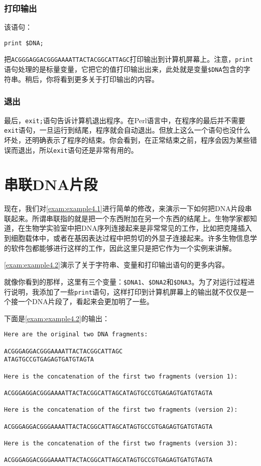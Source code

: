 \subsubsection{打印输出}
该语句：

\begin{lstlisting}
print $DNA;
\end{lstlisting}
把\verb|ACGGGAGGACGGGAAAATTACTACGGCATTAGC|打印输出到计算机屏幕上。注意，\verb|print|语句处理的是标量变量，它把它的值打印输出出来，此处就是变量\verb|$DNA|包含的字符串。稍后，你将看到更多关于打印输出的内容。

\subsubsection{退出}
最后，\verb|exit;|语句告诉计算机退出程序。在Perl语言中，在程序的最后并不需要\verb|exit|语句，一旦运行到结尾，程序就会自动退出。但放上这么一个语句也没什么坏处，还明确表示了程序的结束。你会看到，在正常结束之前，程序会因为某些错误而退出，所以\verb|exit|语句还是非常有用的。

\section{串联DNA片段}
现在，我们对\autoref{exam:example4.1}进行简单的修改，来演示一下如何把DNA片段串联起来。所谓串联指的就是把一个东西附加在另一个东西的结尾上。生物学家都知道，在生物学实验室中把DNA序列连接起来是非常常见的工作，比如把克隆插入到细胞载体中，或者在基因表达过程中把剪切的外显子连接起来。许多生物信息学的软件包都能够进行这样的工作，因此这里只是把它作为一个实例来讲解。

\autoref{exam:example4.2}演示了关于字符串、变量和打印输出语句的更多内容。



就像你看到的那样，这里有三个变量：\verb|$DNA1|、\verb|$DNA2|和\verb|$DNA3|。为了对运行过程进行说明，我添加了一些\verb|print|语句，这样打印到计算机屏幕上的输出就不仅仅是一个接一个DNA片段了，看起来会更加明了一些。

下面是\autoref{exam:example4.2}的输出：

\begin{lstlisting}
Here are the original two DNA fragments:

ACGGGAGGACGGGAAAATTACTACGGCATTAGC
ATAGTGCCGTGAGAGTGATGTAGTA

Here is the concatenation of the first two fragments (version 1):

ACGGGAGGACGGGAAAATTACTACGGCATTAGCATAGTGCCGTGAGAGTGATGTAGTA

Here is the concatenation of the first two fragments (version 2):

ACGGGAGGACGGGAAAATTACTACGGCATTAGCATAGTGCCGTGAGAGTGATGTAGTA

Here is the concatenation of the first two fragments (version 3):

ACGGGAGGACGGGAAAATTACTACGGCATTAGCATAGTGCCGTGAGAGTGATGTAGTA
\end{lstlisting}

